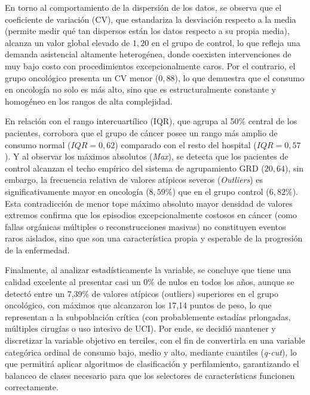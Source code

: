 En torno al comportamiento de la dispersión de los datos, se observa que el coeficiente de variación (CV), que estandariza la desviación respecto a la media (permite medir qué tan dispersos están los datos respecto a su propia media), alcanza un valor global elevado de $1,20$ en el grupo de control, lo que refleja una demanda asistencial altamente heterogénea, donde coexisten intervenciones de muy bajo costo con procedimientos excepcionalmente caros. Por el contrario, el grupo oncológico presenta un CV menor ($0,88$), lo que demuestra que el consumo en oncología no solo es más alto, sino que es estructuralmente constante y homogéneo en los rangos de alta complejidad.

En relación con el rango intercuartílico (IQR), que agrupa al 50\% central de los pacientes, corrobora que el grupo de cáncer posee un rango más amplio de consumo normal ($IQR = 0,62$) comparado con el resto del hospital ($IQR = 0,57$). Y al observar los máximos absolutos (\textit{Max}), se detecta que los pacientes de control alcanzan el techo empírico del sistema de agrupamiento GRD ($20,64$), sin embargo, la frecuencia relativa de valores atípicos severos (\textit{Outliers}) es significativamente mayor en oncología ($8,59\%$) que en el grupo control ($6,82\%$). Esta contradicción de menor tope máximo absoluto mayor densidad de valores extremos confirma que los episodios excepcionalmente costosos en cáncer (como fallas orgánicas múltiples o reconstrucciones masivas) no constituyen eventos raros aislados, sino que son una característica propia y esperable de la progresión de la enfermedad.

Finalmente, al analizar estadísticamente la variable, se concluye que tiene una calidad excelente al presentar casi un 0\% de nulos en todos los años, aunque se detectó entre un 7,39\% de valores atípicos (outliers) superiores en el grupo oncológico, con máximos que alcanzaron los 17,14 puntos de peso, lo que representan a la subpoblación crítica (con probablemente estadías prlongadas, múltiples cirugías o uso intesivo de UCI). Por ende, se decidió mantener y discretizar la variable objetivo en terciles, con el fin de convertirla en una variable categórica ordinal de consumo bajo, medio y alto, mediante cuantiles (\textit{q-cut}), lo que permitirá aplicar algoritmos de clasificación y perfilamiento, garantizando el balanceo de clases necesario para que los selectores de características funcionen correctamente. 

